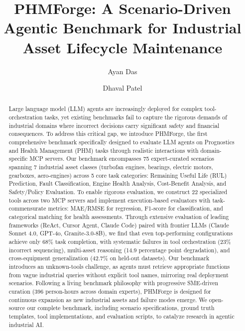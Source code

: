 \documentclass[sigconf,review]{acmart}
\begin{document}
\title{PHMForge: A Scenario-Driven Agentic Benchmark for Industrial Asset Lifecycle Maintenance}

\author{Ayan Das}

\author{Dhaval Patel}
\renewcommand{\shortauthors}{Das et al.}

\begin{abstract}
Large language model (LLM) agents are increasingly deployed for complex tool-orchestration tasks, yet existing benchmarks fail to capture the rigorous demands of industrial domains where incorrect decisions carry significant safety and financial consequences. To address this critical gap, we introduce PHMForge, the first comprehensive benchmark specifically designed to evaluate LLM agents on Prognostics and Health Management (PHM) tasks through realistic interactions with domain-specific MCP servers. Our benchmark encompasses 75 expert-curated scenarios spanning 7 industrial asset classes (turbofan engines, bearings, electric motors, gearboxes, aero-engines) across 5 core task categories: Remaining Useful Life (RUL) Prediction, Fault Classification, Engine Health Analysis, Cost-Benefit Analysis, and Safety/Policy Evaluation. To enable rigorous evaluation, we construct 22 specialized tools across two MCP servers and implement execution-based evaluators with task-commensurate metrics: MAE/RMSE for regression, F1-score for classification, and categorical matching for health assessments. Through extensive evaluation of leading frameworks (ReAct, Cursor Agent, Claude Code) paired with frontier LLMs (Claude Sonnet 4.0, GPT-4o, Granite-3.0-8B), we find that even top-performing configurations achieve only 68\% task completion, with systematic failures in tool orchestration (23\% incorrect sequencing), multi-asset reasoning (14.9 percentage point degradation), and cross-equipment generalization (42.7\% on held-out datasets). Our benchmark introduces an unknown-tools challenge, as agents must retrieve appropriate functions from vague industrial queries without explicit tool names, mirroring real deployment scenarios. Following a living benchmark philosophy with progressive SME-driven curation (396 person-hours across domain experts), PHMForge is designed for continuous expansion as new industrial assets and failure modes emerge. We open-source our complete benchmark, including scenario specifications, ground truth templates, tool implementations, and evaluation scripts, to catalyze research in agentic industrial AI.
\end{abstract}
\end{document}
